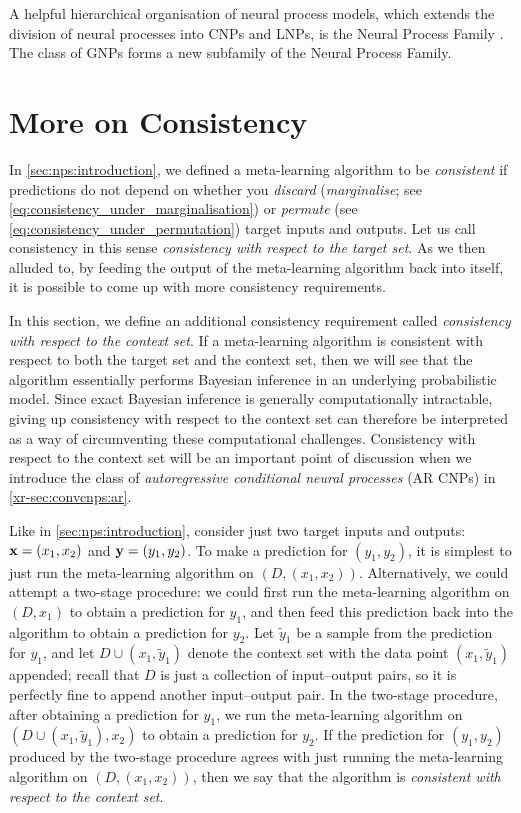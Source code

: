 \documentclass[12pt, twoside]{report}
\newcommand{\xrprefix}[1]{xr-#1}
\begin{document}
A helpful hierarchical organisation of neural process models, which extends the division of neural processes into CNPs and LNPs, is the Neural Process Family \parencite{Gordon:2020:Advanced_in_Probabilistic_Meta-Learning,Dubois:2020:Neural_Process_Family}.
The class of GNPs forms a new subfamily of the Neural Process Family.

\section{More on Consistency}
\label{sec:nps:consistency}

In \cref{sec:nps:introduction}, we defined a meta-learning algorithm to be \emph{consistent} if predictions do not depend on whether you \emph{discard} (\emph{marginalise}; see \eqref{eq:consistency_under_marginalisation}) or \emph{permute} (see \eqref{eq:consistency_under_permutation}) target inputs and outputs.
Let us call consistency in this sense \emph{consistency with respect to the target set}.
As we then alluded to, by feeding the output of the meta-learning algorithm back into itself, it is possible to come up with more consistency requirements.

In this section, we define an additional consistency requirement called \emph{consistency with respect to the context set}.
If a meta-learning algorithm is consistent with respect to both the target set and the context set, then we will see that the algorithm essentially performs Bayesian inference in an underlying probabilistic model.
Since exact Bayesian inference is generally computationally intractable, giving up consistency with respect to the context set can therefore be interpreted as a way of circumventing these computational challenges.
Consistency with respect to the context set will be an important point of discussion when we introduce the class of \emph{autoregressive conditional neural processes} (AR CNPs) in \cref{\xrprefix{sec:convcnps:ar}}.

Like in \cref{sec:nps:introduction}, consider just two target inputs and outputs: $\mathbf{x} = (x_1, x_2)$ and $\mathbf{y} = (y_1, y_2)$.
To make a prediction for $(y_1, y_2)$, it is simplest to just run the meta-learning algorithm on $(D, (x_1, x_2))$.
Alternatively, we could attempt a two-stage procedure:
we could first run the meta-learning algorithm on $(D, x_1)$ to obtain a prediction for $y_1$,
and then feed this prediction back into the algorithm to obtain a prediction for $y_2$.
Let $\tilde y_1$ be a sample from the prediction for $y_1$,
and let $D \cup (x_1, \tilde y_1)$ denote the context set with the data point $(x_1, \tilde y_1)$ appended;
recall that $D$ is just a collection of input--output pairs, so it is perfectly fine to append another input--output pair.
In the two-stage procedure, after obtaining a prediction for $y_1$,
we run the meta-learning algorithm on $(D \cup (x_1, \tilde y_1), x_2)$ to obtain a prediction for $y_2$.
If the prediction for $(y_1, y_2)$ produced by the two-stage procedure agrees with just running the meta-learning algorithm on $(D, (x_1, x_2))$, then we say that the algorithm is \emph{consistent with respect to the context set}.
\end{document}
